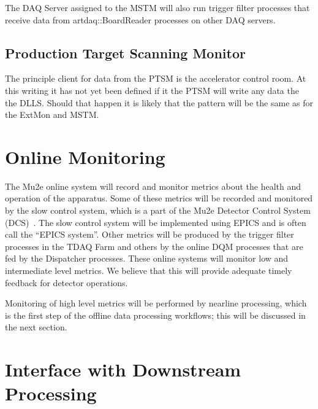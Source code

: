 \begin{sloppypar}
The DAQ Server assigned to the MSTM will also run trigger filter processes that receive
data from {\code artdaq::BoardReader} processes on other DAQ servers.
\end{sloppypar}


\subsection{Production Target Scanning Monitor}

The principle client for data from the PTSM is the accelerator control room.
At this writing it has not yet been defined if it the PTSM will write any data the the DLLS.
Should that happen it is likely that the pattern will be the same as for the ExtMon
and MSTM.

\section{Online Monitoring}
\label{sec:onlineMonitoring}

The Mu2e online system will record and monitor metrics about the health and operation of the apparatus.
Some of these metrics will be recorded and monitored by the slow control system,
which is a part	of the Mu2e Detector Control System (DCS)~\cite{DCSSpec}.
The slow control system will be implemented using EPICS and is often call the ``EPICS system''.
Other metrics will be produced by the trigger filter processes in the TDAQ Farm
and others by the online DQM processes that are fed by the Dispatcher processes.
These online systems will monitor low and intermediate level metrics.
We believe that this will provide adequate timely feedback for detector operations.

Monitoring of high level metrics will be performed by nearline processing,
which is the first step of the offline data processing workflows;
this will be discussed in the next section.

\section{Interface with Downstream Processing}
\label{sec:downstreamProcessing}

